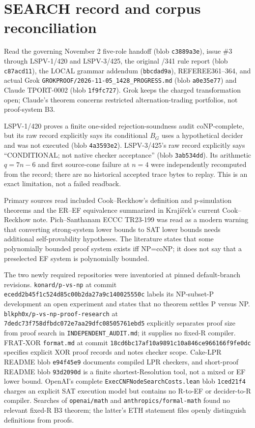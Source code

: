 \documentclass[11pt]{article}
\begin{document}
\section{SEARCH record and corpus reconciliation}

Read the governing November 2 five-role handoff (blob
\texttt{c3889a3e}), issue \#3 through LSPV-1/420 and LSPV-3/425, the original
/341 rule report (blob \texttt{c87acd11}), the LOCAL grammar addendum
(\texttt{bbcdad9a}), REFEREE361--364, and actual Grok
\texttt{GROKPROOF/2026-11-05\_1428\_PROGRESS.md} (blob
\texttt{a0e35e77}) and Claude TPORT-0002 (blob \texttt{1f9fc727}).  Grok keeps
the charged transformation open; Claude's theorem concerns restricted
alternation-trading portfolios, not proof-system B3.

LSPV-1/420 proves a finite one-sided rejection-soundness audit coNP-complete,
but its raw record explicitly says its conditional $B_G$ uses a hypothetical
decider and was not executed (blob \texttt{4a3593e2}).  LSPV-3/425's raw record
explicitly says ``CONDITIONAL; not native checker acceptance'' (blob
\texttt{3ab534dd}).  Its arithmetic $q=7n-6$ and first source-cone failure at
$n=4$ were independently recomputed from the record; there are no historical
accepted trace bytes to replay.  This is an exact limitation, not a failed
readback.

Primary sources read included Cook--Reckhow's definition and p-simulation
theorems and the ER--EF equivalence summarized in Kraj\'i\v cek's current
Cook--Reckhow note.  Pich--Santhanam ECCC TR23-199 was read as a modern warning
that converting strong-system lower bounds to SAT lower bounds needs additional
self-provability hypotheses.  The literature states that some polynomially
bounded proof system exists iff NP=coNP; it does not say that a preselected EF
system is polynomially bounded.

The two newly required repositories were inventoried at pinned default-branch
revisions.  \texttt{konard/p-vs-np} at commit
\texttt{ecedd2b45f1c524d85c00b2da27a9c140025550c} labels its NP-subset-P
development an open experiment and states that no theorem settles P versus NP.
\texttt{blkph0x/p-vs-np-proof-research} at
\texttt{7dedc73f758dfbdc072e7aa29dfc08505761ebd5} explicitly separates proof
size from proof search in \texttt{INDEPENDENT\_AUDIT.md}; it supplies no fixed-R
compiler.  FRAT-XOR \texttt{format.md} at commit
\texttt{18cd6bc17af10a9891c10a846ce966166f9fe0dc} specifies explicit XOR
proof records and notes checker scope.  Cake-LPR README blob
\texttt{e94f45e9} documents compiled LPR checkers, and short-proof README blob
\texttt{93d2090d} is a finite shortest-Resolution tool, not a mixed or EF lower
bound.  OpenAI's complete
\texttt{ExecCNFNodeSearchCosts.lean} blob \texttt{1ced21f4} charges an explicit
SAT execution model but contains no R-to-EF or decider-to-R compiler.  Searches
of \texttt{openai/math} and \texttt{anthropics/formal-math} found no relevant
fixed-R B3 theorem; the latter's ETH statement files openly distinguish
definitions from proofs.
\end{document}
